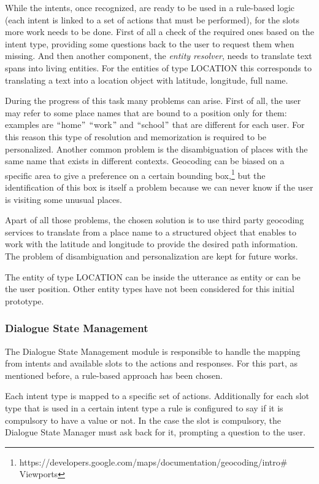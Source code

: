 While the intents, once recognized, are ready to be used in a rule-based logic (each intent is linked to a set of actions that must be performed), for the slots more work needs to be done. First of all a check of the required ones based on the intent type, providing some questions back to the user to request them when missing. And then another component, the \textit{entity resolver}, needs to translate text spans into living entities. For the entities of type LOCATION this corresponds to translating a text into a location object with latitude, longitude, full name.

During the progress of this task many problems can arise. First of all, the user may refer to some place names that are bound to a position only for them: examples are $``$home$"$  $``$work$"$  and $``$school$"$  that are different for each user. For this reason this type of resolution and memorization is required to be personalized. Another common problem is the disambiguation of places with the same name that exists in different contexts. Geocoding can be biased on a specific area to give a preference on a certain bounding box,\footnote{ https://developers.google.com/maps/documentation/geocoding/intro$\#$ Viewports  } but the identification of this box is itself a problem because we can never know if the user is visiting some unusual places.

Apart of all those problems, the chosen solution is to use third party geocoding services to translate from a place name to a structured object that enables to work with the latitude and longitude to provide the desired path information. The problem of disambiguation and personalization are kept for future works.

The entity of type LOCATION can be inside the utterance as entity or can be the user position. Other entity types have not been considered for this initial prototype.

\subsubsection{Dialogue State Management}
The Dialogue State Management module is responsible to handle the mapping from intents and available slots to the actions and responses. For this part, as mentioned before, a rule-based approach has been chosen.

Each intent type is mapped to a specific set of actions. Additionally for each slot type that is used in a certain intent type a rule is configured to say if it is compulsory to have a value or not. In the case the slot is compulsory, the Dialogue State Manager must ask back for it, prompting a question to the user.

